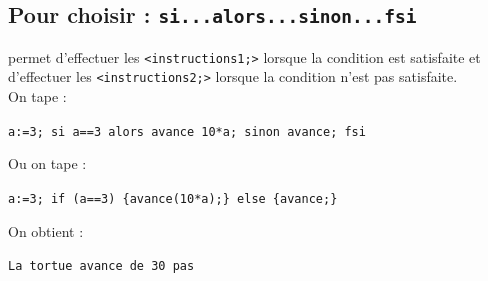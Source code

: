 \documentclass[a4paper,11pt]{book}
\begin{document}
\subsection{Pour choisir : {\tt si...alors...sinon...fsi}}
permet d'effectuer les  {\tt <instructions1;>} lorsque la condition est 
satisfaite et d'effectuer les {\tt <instructions2;>} lorsque la condition n'est
 pas satisfaite.\\
On tape :
\begin{center}{\tt a:=3; si a==3 alors avance 10*a; sinon avance; fsi }\end{center}
Ou on tape :
\begin{center}{\tt a:=3; if (a==3) \{avance(10*a);\} else \{avance;\}}\end{center}
On obtient :
\begin{center}{\tt La tortue avance de 30 pas}\end{center}
\end{document}
